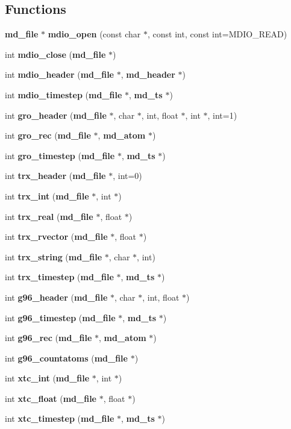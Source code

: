 \subsection*{Functions}
\begin{CompactItemize}
\item 
{\bf md\_\-file} $\ast$ {\bf mdio\_\-open} (const char $\ast$, const int, const int=MDIO\_\-READ)
\item 
int {\bf mdio\_\-close} ({\bf md\_\-file} $\ast$)
\item 
int {\bf mdio\_\-header} ({\bf md\_\-file} $\ast$, {\bf md\_\-header} $\ast$)
\item 
int {\bf mdio\_\-timestep} ({\bf md\_\-file} $\ast$, {\bf md\_\-ts} $\ast$)
\item 
int {\bf gro\_\-header} ({\bf md\_\-file} $\ast$, char $\ast$, int, float $\ast$, int $\ast$, int=1)
\item 
int {\bf gro\_\-rec} ({\bf md\_\-file} $\ast$, {\bf md\_\-atom} $\ast$)
\item 
int {\bf gro\_\-timestep} ({\bf md\_\-file} $\ast$, {\bf md\_\-ts} $\ast$)
\item 
int {\bf trx\_\-header} ({\bf md\_\-file} $\ast$, int=0)
\item 
int {\bf trx\_\-int} ({\bf md\_\-file} $\ast$, int $\ast$)
\item 
int {\bf trx\_\-real} ({\bf md\_\-file} $\ast$, float $\ast$)
\item 
int {\bf trx\_\-rvector} ({\bf md\_\-file} $\ast$, float $\ast$)
\item 
int {\bf trx\_\-string} ({\bf md\_\-file} $\ast$, char $\ast$, int)
\item 
int {\bf trx\_\-timestep} ({\bf md\_\-file} $\ast$, {\bf md\_\-ts} $\ast$)
\item 
int {\bf g96\_\-header} ({\bf md\_\-file} $\ast$, char $\ast$, int, float $\ast$)
\item 
int {\bf g96\_\-timestep} ({\bf md\_\-file} $\ast$, {\bf md\_\-ts} $\ast$)
\item 
int {\bf g96\_\-rec} ({\bf md\_\-file} $\ast$, {\bf md\_\-atom} $\ast$)
\item 
int {\bf g96\_\-countatoms} ({\bf md\_\-file} $\ast$)
\item 
int {\bf xtc\_\-int} ({\bf md\_\-file} $\ast$, int $\ast$)
\item 
int {\bf xtc\_\-float} ({\bf md\_\-file} $\ast$, float $\ast$)
\item 
int {\bf xtc\_\-timestep} ({\bf md\_\-file} $\ast$, {\bf md\_\-ts} $\ast$)

\end{CompactItemize}
